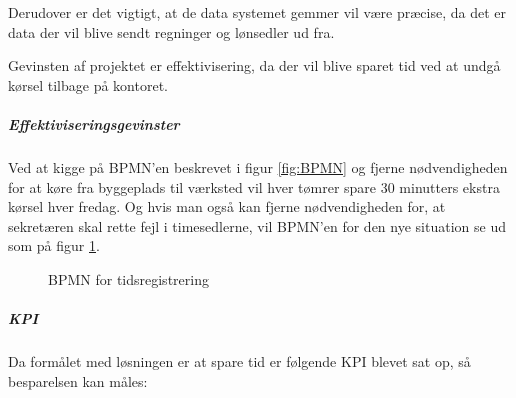 Derudover er det vigtigt, at de data systemet gemmer vil være præcise, da det er data der vil blive sendt regninger og lønsedler ud fra.

Gevinsten af projektet er effektivisering, da der vil blive sparet tid ved at undgå kørsel tilbage på kontoret.

\subparagraph{Effektiviseringsgevinster}
Ved at kigge på BPMN'en beskrevet i figur \ref{fig:BPMN} og fjerne nødvendigheden for at køre fra byggeplads til værksted vil hver tømrer spare 30 minutters ekstra kørsel hver fredag.
Og hvis man også kan fjerne nødvendigheden for, at sekretæren skal rette fejl i timesedlerne, vil BPMN'en for den nye situation se ud som på figur \ref{fig:BPMN2}.

\begin{figure}
    \caption{BPMN for tidsregistrering}
    \label{fig:BPMN2}
\end{figure}

\subparagraph{KPI}
Da formålet med løsningen er at spare tid er følgende KPI blevet sat op, så besparelsen kan måles:

